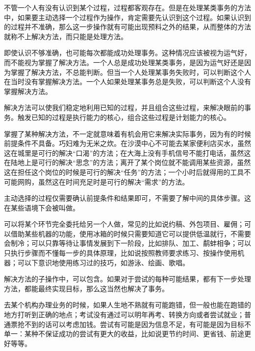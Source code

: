 不管一个人有没有认识到某个过程，过程都客观存在。但是在处理某类事务的方法中，如果要主动选择一个过程作为操作，肯定需要先认识到这个过程。如果认识到的过程并不准确，那么这一步操作就有可能出现预料之外的结果，从而整体的方法就称不上解决方法，而只能是处理方法。
\begin{explain}
即使认识不够准确，也可能每次都能成功处理事务。这种情况应该被视为运气好，而不能视为掌握了解决方法。一个人总是成功处理某类事务，是因为运气好还是因为掌握了解决方法，不总能判断。但当一个人处理某事务失败时，可以判断这个人在当时没有掌握解决方法。一个人如果处理某事务总是失败，可以判断这个人没有掌握解决方法。
\end{explain}
解决方法可以使我们稳定地利用已知的过程，并且组合这些过程，来解决眼前的事务。触发已知的过程是执行能力的核心，组合这些过程是计划能力的核心。
\begin{examples}
掌握了某种解决方法，不一定就意味着有机会用它来解决实际事务，因为有的时候前提条件不具备。巧妇难为无米之炊。在沙漠中心不可能去某家便利店买水，虽然这在城里是可行的解决“口渴”的方法；在大海上没有手机信号不能打电话，虽然这在陆地上是可行的解决“思念”的方法；离开了某个岗位就不能调用某些资源，虽然这在担任这个岗位的时候是可行的解决“任务”的方法；一个小时后就得用的工具不可能网购，虽然这在时间充足时是可行的解决“需求”的方法。
\end{examples}
主动选择的过程仅需要确认前提条件和结果即可，不需要了解中间的具体步骤。这在某些语境下会被叫做。
\begin{examples}
可以将某个环节完全委托给另一个人做，常见的比如说约稿、外包项目、雇佣；可以借助某些机器的功能，使用冰箱的时候只需要知道它可以提供低温就行，不需要会制冷；可以只靠等待让事情发展到下一阶段，比如排队、加工、鹬蚌相争；可以只执行步骤而不懂每一步的具体原理，比如说按照教师要求练习、按操作使用机器；可以下意识地使用练习过的技巧，如游泳、绘画、歌唱。
\end{examples}
解决方法的子操作中，可以包含。如果对于尝试的每种可能结果，都有下一步处理方法，都能最终实现目标，那么这当然也解决了事务。
\begin{examples}
去某个机构办理业务的时候，如果人生地不熟就有可能跑错，但一般也能在跑错的地方打听到正确的地点；考试没有通过可以明年再考、转换方向或者尝试就业；普通票抢不到的话可以考虑加钱。尝试有可能是因为信息不足，有可能是因为目标不单一：某种不保证成功的尝试有更大的收益，比如说更节约时间、更省钱、前途更好等等。
\end{examples}


